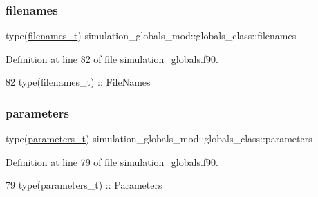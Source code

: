 \subsubsection{\texorpdfstring{filenames}{filenames}}
{\footnotesize\ttfamily type(\mbox{\hyperlink{structsimulation__globals__mod_1_1filenames__t}{filenames\+\_\+t}}) simulation\+\_\+globals\+\_\+mod\+::globals\+\_\+class\+::filenames\hspace{0.3cm}{\ttfamily [private]}}



Definition at line 82 of file simulation\+\_\+globals.\+f90.


\begin{DoxyCode}
82         \textcolor{keywordtype}{type}(filenames\_t)   :: FileNames
\end{DoxyCode}
\mbox{\label{structsimulation__globals__mod_1_1globals__class_aef60024afa0a128d0af3d8a47a732657}} 
\subsubsection{\texorpdfstring{parameters}{parameters}}
{\footnotesize\ttfamily type(\mbox{\hyperlink{structsimulation__globals__mod_1_1parameters__t}{parameters\+\_\+t}}) simulation\+\_\+globals\+\_\+mod\+::globals\+\_\+class\+::parameters\hspace{0.3cm}{\ttfamily [private]}}



Definition at line 79 of file simulation\+\_\+globals.\+f90.


\begin{DoxyCode}
79         \textcolor{keywordtype}{type}(parameters\_t)  :: Parameters
\end{DoxyCode}
\mbox{\label{structsimulation__globals__mod_1_1globals__class_aa066434c9dc6147331dce613422568ae}} 
